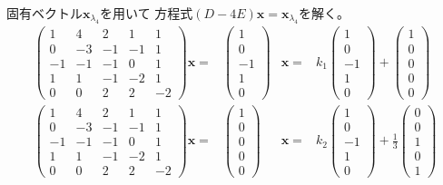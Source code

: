 \documentclass[12pt,b5paper]{ltjsarticle}
\begin{document}
固有ベクトル$\bm{x}_{\lambda_4}$を用いて
方程式$(D-4E)\bm{x}=\bm{x}_{\lambda_4}$を解く。
\begin{align}
 \begin{pmatrix}
  1 & 4 & 2 & 1 & 1 \\
  0 & -3 & -1 & -1 & 1 \\
  -1 & -1 & -1 & 0 & 1 \\
  1 & 1 & -1 & -2 & 1 \\
  0 & 0 & 2 & 2 & -2
 \end{pmatrix}
 \bm{x}
 =&
 \begin{pmatrix} 1 \\ 0 \\ -1 \\ 1 \\ 0 \end{pmatrix}
 &
 \bm{x}=&
 k_1\begin{pmatrix} 1 \\ 0 \\ -1 \\ 1 \\ 0 \end{pmatrix}
 +\begin{pmatrix} 1 \\ 0 \\ 0 \\ 0 \\ 0 \end{pmatrix}\\
 \begin{pmatrix}
  1 & 4 & 2 & 1 & 1 \\
  0 & -3 & -1 & -1 & 1 \\
  -1 & -1 & -1 & 0 & 1 \\
  1 & 1 & -1 & -2 & 1 \\
  0 & 0 & 2 & 2 & -2
 \end{pmatrix}
 \bm{x}
 =&
 \begin{pmatrix} 1 \\ 0 \\ 0 \\ 0 \\ 0 \end{pmatrix}
 &
 \bm{x}=&
 k_2\begin{pmatrix} 1 \\ 0 \\ -1 \\ 1 \\ 0 \end{pmatrix}
 +\frac{1}{3}\begin{pmatrix} 0 \\ 0 \\ 1 \\ 0 \\ 1 \end{pmatrix}
\end{align}
\end{document}
